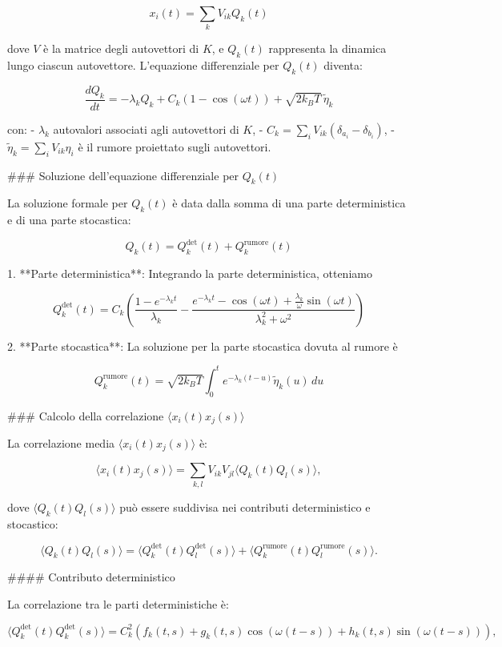 \documentclass[Lau,binding=0.6cm,oneside,noexaminfo]{sapthesis}
\begin{document}
\[
x_i(t) = \sum_k V_{ik} Q_k(t)
\]

dove \( V \) è la matrice degli autovettori di \( K \), e \( Q_k(t) \) rappresenta la dinamica lungo ciascun autovettore. L'equazione differenziale per \( Q_k(t) \) diventa:

\[
\frac{dQ_k}{dt} = -\lambda_k Q_k + C_k (1 - \cos(\omega t)) + \sqrt{2 k_B T} \, \tilde{\eta}_k
\]

con:
- \( \lambda_k \) autovalori associati agli autovettori di \( K \),
- \( C_k = \sum_i V_{ik} (\delta_{a_i} - \delta_{b_i}) \),
- \( \tilde{\eta}_k = \sum_i V_{ik} \eta_i \) è il rumore proiettato sugli autovettori.

### Soluzione dell'equazione differenziale per \( Q_k(t) \)

La soluzione formale per \( Q_k(t) \) è data dalla somma di una parte deterministica e di una parte stocastica:

\[
Q_k(t) = Q_k^{\text{det}}(t) + Q_k^{\text{rumore}}(t)
\]

1. **Parte deterministica**: Integrando la parte deterministica, otteniamo

   \[
   Q_k^{\text{det}}(t) = C_k \left( \frac{1 - e^{-\lambda_k t}}{\lambda_k} - \frac{e^{-\lambda_k t} - \cos(\omega t) + \frac{\lambda_k}{\omega} \sin(\omega t)}{\lambda_k^2 + \omega^2} \right)
   \]

2. **Parte stocastica**: La soluzione per la parte stocastica dovuta al rumore è

   \[
   Q_k^{\text{rumore}}(t) = \sqrt{2 k_B T} \int_0^t e^{-\lambda_k (t - u)} \tilde{\eta}_k(u) \, du
   \]

   ### Calcolo della correlazione \(\langle x_i(t) x_j(s) \rangle\)

   La correlazione media \(\langle x_i(t) x_j(s) \rangle\) è:
   
   \[
   \langle x_i(t) x_j(s) \rangle = \sum_{k, l} V_{ik} V_{jl} \langle Q_k(t) Q_l(s) \rangle,
   \]
   
   dove \(\langle Q_k(t) Q_l(s) \rangle\) può essere suddivisa nei contributi deterministico e stocastico:
   
   \[
   \langle Q_k(t) Q_l(s) \rangle = \langle Q_k^{\text{det}}(t) Q_l^{\text{det}}(s) \rangle + \langle Q_k^{\text{rumore}}(t) Q_l^{\text{rumore}}(s) \rangle.
   \]
   
   #### Contributo deterministico
   
   La correlazione tra le parti deterministiche è:
   
   \[
   \langle Q_k^{\text{det}}(t) Q_k^{\text{det}}(s) \rangle = C_k^2 \left( f_k(t, s) + g_k(t, s) \cos(\omega (t - s)) + h_k(t, s) \sin(\omega (t - s)) \right),
   \]
   
\end{document}
